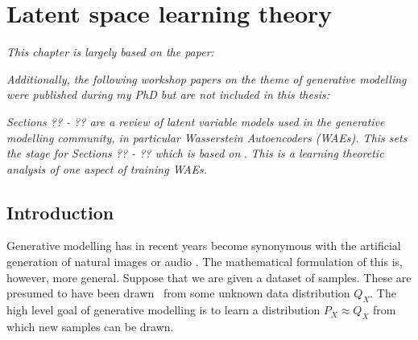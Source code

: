 \chapter{Latent space learning theory} %

\ifpdf
    \graphicspath{{Chapter5/Figs/Raster/}{Chapter5/Figs/PDF/}{Chapter5/Figs/}}
\else
    \graphicspath{{Chapter5/Figs/Vector/}{Chapter5/Figs/}}
\fi

\emph{This chapter is largely based on the paper:}

\begin{quote}
\end{quote}

\emph{Additionally, the following workshop papers on the theme of generative modelling were published during my PhD but are not included in this thesis:}

\begin{quote}
\end{quote}

\begin{quote}
\end{quote}

\emph{Sections ?? - ?? are a review of latent variable models used in the generative modelling community, in particular Wasserstein Autoencoders (WAEs). 
This sets the stage for Sections ?? - ?? which is based on} \cite{rubenstein2019practical}.
\emph{This is a learning theoretic analysis of one aspect of training WAEs.}


\section{Introduction}

Generative modelling has in recent years become synonymous with the artificial generation of natural images or audio \cite{something_for_images, wavenet?}.
The mathematical formulation of this is, however, more general.
Suppose that we are given a dataset of samples. 
These are presumed to have been drawn \iid~from some unknown data distribution $Q_X$.
The high level goal of generative modelling is to learn a distribution $P_X \approx Q_X$ from which new samples can be drawn. 

